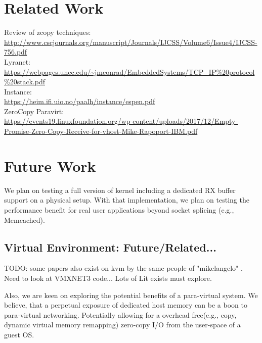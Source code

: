 \section{Related Work}
Review of zcopy techniques:\\
\url{http://www.cscjournals.org/manuscript/Journals/IJCSS/Volume6/Issue4/IJCSS-756.pdf}\\
Lyranet:\\
\url{https://webpages.uncc.edu/~jmconrad/EmbeddedSystems/TCP_IP\%20protocol\%20stack.pdf}\\
Instance:\\
\url{https://heim.ifi.uio.no/paalh/instance/espen.pdf}\\
ZeroCopy Paravirt:\\
\url{https://events19.linuxfoundation.org/wp-content/uploads/2017/12/Empty-Promise-Zero-Copy-Receive-for-vhost-Mike-Rapoport-IBM.pdf}

\section{Future Work}
We plan on testing a full version of \oursys kernel including a dedicated RX buffer support on a physical setup. With that implementation, we plan on testing the performance benefit for real user applications beyond socket splicing (e.g., Memcached).

\subsection{Virtual Environment: Future/Related...}
TODO: some papers also exist on kvm by the same people of "mikelangelo" \cite{mikelangelo}. Need to look at VMXNET3 code... Lots of Lit exists must explore.

Also, we are keen on exploring the potential benefits of \oursys a para-virtual system. We believe, that a perpetual exposure of dedicated host memory can be a boon to para-virtual networking. Potentially allowing for a overhead free(e.g., copy, dynamic virtual memory remapping) zero-copy I/O from the user-space of a guest OS.


